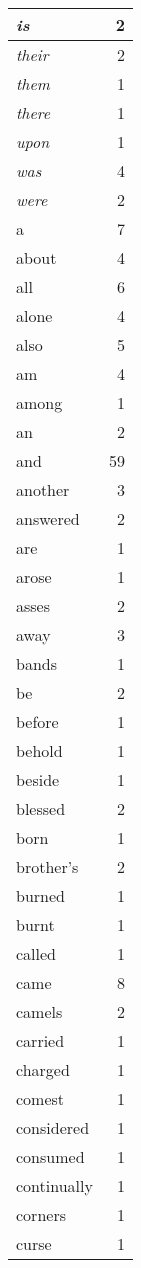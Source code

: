\begin{center}
\begin{longtable}{l|r}
\emph{is} & 2\\ \hline 
\emph{their} & 2\\ \hline 
\emph{them} & 1\\ \hline 
\emph{there} & 1\\ \hline 
\emph{upon} & 1\\ \hline 
\emph{was} & 4\\ \hline 
\emph{were} & 2\\ \hline 
a & 7\\ \hline 
about & 4\\ \hline 
all & 6\\ \hline 
alone & 4\\ \hline 
also & 5\\ \hline 
am & 4\\ \hline 
among & 1\\ \hline 
an & 2\\ \hline 
and & 59\\ \hline 
another & 3\\ \hline 
answered & 2\\ \hline 
are & 1\\ \hline 
arose & 1\\ \hline 
asses & 2\\ \hline 
away & 3\\ \hline 
bands & 1\\ \hline 
be & 2\\ \hline 
before & 1\\ \hline 
behold & 1\\ \hline 
beside & 1\\ \hline 
blessed & 2\\ \hline 
born & 1\\ \hline 
brother's & 2\\ \hline 
burned & 1\\ \hline 
burnt & 1\\ \hline 
called & 1\\ \hline 
came & 8\\ \hline 
camels & 2\\ \hline 
carried & 1\\ \hline 
charged & 1\\ \hline 
comest & 1\\ \hline 
considered & 1\\ \hline 
consumed & 1\\ \hline 
continually & 1\\ \hline 
corners & 1\\ \hline 
curse & 1\\ \hline 

\end{longtable}
\end{center}
